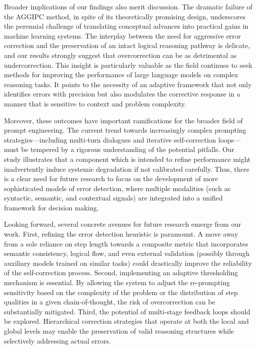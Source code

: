 \documentclass[11pt]{article}
\begin{document}
Broader implications of our findings also merit discussion. The dramatic failure of the AGGIPC method, in spite of its theoretically promising design, underscores the perennial challenge of translating conceptual advances into practical gains in machine learning systems. The interplay between the need for aggressive error correction and the preservation of an intact logical reasoning pathway is delicate, and our results strongly suggest that overcorrection can be as detrimental as undercorrection. This insight is particularly valuable as the field continues to seek methods for improving the performance of large language models on complex reasoning tasks. It points to the necessity of an adaptive framework that not only identifies errors with precision but also modulates the corrective response in a manner that is sensitive to context and problem complexity.

Moreover, these outcomes have important ramifications for the broader field of prompt engineering. The current trend towards increasingly complex prompting strategies—including multi-turn dialogues and iterative self-correction loops—must be tempered by a rigorous understanding of the potential pitfalls. Our study illustrates that a component which is intended to refine performance might inadvertently induce systemic degradation if not calibrated carefully. Thus, there is a clear need for future research to focus on the development of more sophisticated models of error detection, where multiple modalities (such as syntactic, semantic, and contextual signals) are integrated into a unified framework for decision making.

Looking forward, several concrete avenues for future research emerge from our work. First, refining the error detection heuristic is paramount. A move away from a sole reliance on step length towards a composite metric that incorporates semantic consistency, logical flow, and even external validation (possibly through auxiliary models trained on similar tasks) could drastically improve the reliability of the self-correction process. Second, implementing an adaptive thresholding mechanism is essential. By allowing the system to adjust the re-prompting sensitivity based on the complexity of the problem or the distribution of step qualities in a given chain-of-thought, the risk of overcorrection can be substantially mitigated. Third, the potential of multi-stage feedback loops should be explored. Hierarchical correction strategies that operate at both the local and global levels may enable the preservation of valid reasoning structures while selectively addressing actual errors.
\end{document}
